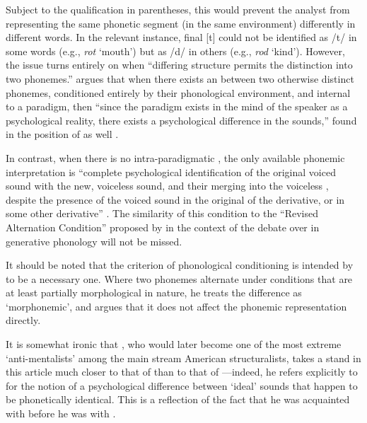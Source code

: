 Subject to the qualification in parentheses, this would prevent the
analyst from representing the same phonetic segment (in the same
environment) differently in different words. In the relevant instance,
 final [t] could not be identified as /t/ in some words (e.g.,
\emph{rot} `mouth') but as /d/ in others (e.g., \emph{rod}
`kind'). However, the issue turns entirely on when ``differing
structure permits the distinction into two phonemes.'' {\Trager} argues
that when there exists an  between two otherwise distinct
phonemes, conditioned entirely by their phonological environment, and
internal to a paradigm, then ``since the paradigm exists in the mind of
the speaker as a psychological reality, there exists a psychological
difference in the sounds,'' found in the position of  as
well \citep[341]{trager34:russian}.

In {contrast}, when there is no intra-paradigmatic , the only
available phonemic interpretation is ``complete psychological
identification of the original voiced sound with the new, voiceless
sound, and their merging into the voiceless , despite the
presence of the voiced sound in the original of the derivative, or in
some other derivative'' \citep[342]{trager34:russian}. The similarity
of this condition to the ``Revised Alternation Condition'' proposed by
\citet{kiparsky:3dimensions} in the context of the debate over
 in generative phonology will not be missed.

It should be noted that the criterion of phonological conditioning is
intended by {\Trager} to be a necessary one. Where two phonemes alternate
under conditions that are at least partially morphological in nature,
he treats the difference as `morphonemic', and argues that it does not
affect the phonemic representation directly.

It is somewhat ironic that {\Trager}, who would later become one of the
most extreme `anti-mentalists' among the main stream American
structuralists, takes a stand in this article much closer to that of
{\Sapir} than to that of {\Bloomfield}—indeed, he refers explicitly to
\citealt{sapir25:sound.patterns} for the notion of a psychological
difference between `ideal' sounds that happen to be phonetically
identical. This is a reflection of the fact that he was acquainted
with {\Sapir} before he was with {\Bloomfield}.

